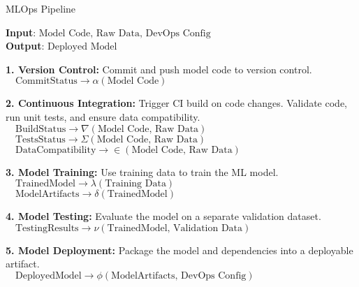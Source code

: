 \documentclass[12pt, letterpaper]{article}
\begin{document}
\begin{algorithm}[h!]
    \caption{MLOps Pipeline}
    \label{alg:mlops-pipeline}
    \scriptsize
    \textbf{Input}: $\text{Model Code, Raw Data, DevOps Config}$ \\
    \textbf{Output}: $\text{Deployed Model}$ \\
    \begin{algorithmic}[1]
        
        \State \textbf{1. Version Control:}
        \State \quad Commit and push model code to version control. \\
        $ \quad \text{CommitStatus} \xrightarrow{} \alpha(\text{Model Code})$ 

        \State \textbf{2. Continuous Integration:}
        \State \quad Trigger CI build on code changes.
        \State \quad Validate code, run unit tests, and ensure data compatibility. \\
        $ \quad \text{BuildStatus} \xrightarrow{} \nabla(\text{Model Code, Raw Data})$  \\
        $ \quad \text{TestsStatus} \xrightarrow{} \Sigma(\text{Model Code, Raw Data})$  \\
        $ \quad \text{DataCompatibility} \xrightarrow{} \in(\text{Model Code, Raw Data})$ 

        \State \textbf{3. Model Training:}
        \State \quad Use training data to train the ML model. \\
        $ \quad \text{TrainedModel} \xrightarrow{} \lambda(\text{Training Data})$  \\
        $ \quad \text{ModelArtifacts} \xrightarrow{} \delta(\text{TrainedModel})$ 

        \State \textbf{4. Model Testing:}
        \State \quad Evaluate the model on a separate validation dataset. \\
        $ \quad \text{TestingResults} \xrightarrow{} \nu(\text{TrainedModel, Validation Data})$ 

        \State \textbf{5. Model Deployment:}
        \State \quad Package the model and dependencies into a deployable artifact. \\
        $ \quad \text{DeployedModel} \xrightarrow{} \phi(\text{ModelArtifacts, DevOps Config})$ 


\end{algorithmic}
\end{algorithm}
\end{document}

